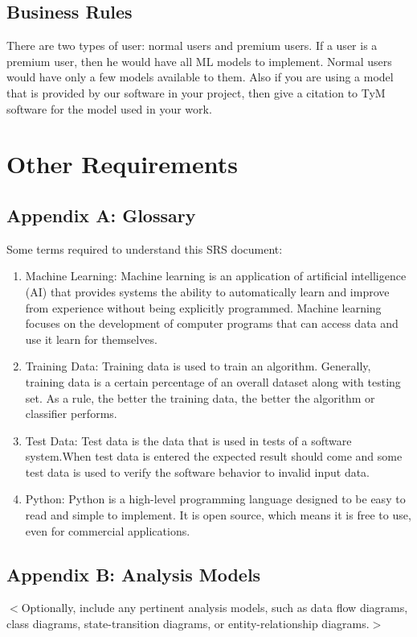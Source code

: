 \documentclass{scrreprt}
\begin{document}
\section{Business Rules}
There are two types of user: normal users and premium users. If a user is a premium user, then he would have all ML models to implement. Normal users would have only a few models available to them. Also if you are using a model that is provided by our software in your project, then give a citation to TyM software for the model used in your work.


\chapter{Other Requirements}

\section{Appendix A: Glossary}
Some terms required to understand this SRS document: 
\begin{enumerate}
\item Machine Learning: Machine learning is an application of artificial intelligence (AI) that provides systems the ability to automatically learn and improve from experience without being explicitly programmed. Machine learning focuses on the development of computer programs that can access data and use it learn for themselves.
\item Training Data: Training data is used to train an algorithm. Generally, training data is a certain percentage of an overall dataset along with testing set. As a rule, the better the training data, the better the algorithm or classifier performs.
\item Test Data: Test data is the data that is used in tests of a software system.When test data is entered the expected result should come and some test data is used to verify the software behavior to invalid input data.
\item Python: Python is a high-level programming language designed to be easy to read and simple to implement. It is open source, which means it is free to use, even for commercial applications.
\end{enumerate}

\section{Appendix B: Analysis Models}
$<$Optionally, include any pertinent analysis models, such as data flow 
diagrams, class diagrams, state-transition diagrams, or entity-relationship 
diagrams.$>$
\end{document}
